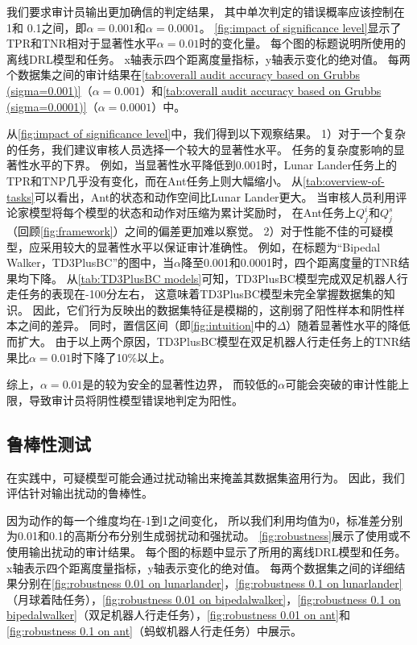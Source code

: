 我们要求审计员输出更加确信的判定结果，
其中单次判定的错误概率应该控制在 1\textperthousand 和 0.1\textperthousand 之间，即$\alpha=0.001$和$\alpha=0.0001$。
\autoref{fig:impact of significance level}显示了TPR和TNR相对于显著性水平$\alpha=0.01$时的变化量。
每个图的标题说明所使用的离线DRL模型和任务。
x轴表示四个距离度量指标，y轴表示变化的绝对值。
每两个数据集之间的审计结果在\autoref{tab:overall audit accuracy based on Grubbs (sigma=0.001)}（$\alpha=0.001$）和\autoref{tab:overall audit accuracy based on Grubbs (sigma=0.0001)}（$\alpha=0.0001$）中。

从\autoref{fig:impact of significance level}中，我们得到以下观察结果。
1）对于一个复杂的任务，我们建议审核人员选择一个较大的显著性水平。
任务的复杂度影响\sysnameo 的显著性水平的下界。
例如，当显著性水平降低到0.001时，Lunar Lander任务上的TPR和TNP几乎没有变化，而在Ant任务上则大幅缩小。
从\autoref{tab:overview-of-tasks}可以看出，Ant的状态和动作空间比Lunar Lander更大。
当审核人员利用评论家模型将每个模型的状态和动作对压缩为累计奖励时，
在Ant任务上$Q_j^i$和$Q_j^s$（回顾\autoref{fig:framework}）之间的偏差更加难以察觉。
2）对于性能不佳的可疑模型，\sysnameo 应采用较大的显著性水平以保证审计准确性。
例如，在标题为“Bipedal Walker，TD3PlusBC”的图中，当$\alpha$降至0.001和0.0001时，四个距离度量的TNR结果均下降。
从\autoref{tab:TD3PlusBC models}可知，TD3PlusBC模型完成双足机器人行走任务的表现在-100分左右，
这意味着TD3PlusBC模型未完全掌握数据集的知识。
因此，它们行为反映出的数据集特征是模糊的，这削弱了阳性样本和阴性样本之间的差异。
同时，置信区间（即\autoref{fig:intuition}中的$\Delta$）随着显著性水平的降低而扩大。
由于以上两个原因，TD3PlusBC模型在双足机器人行走任务上的TNR结果比$\alpha=0.01$时下降了10\%以上。

综上，$\alpha=0.01$是\sysnameo 的较为安全的显著性边界，
而较低的$\alpha$可能会突破\sysnameo 的审计性能上限，导致审计员将阴性模型错误地判定为阳性。

\subsection{鲁棒性测试}
\label{sec:robustness}
在实践中，可疑模型可能会通过扰动输出来掩盖其数据集盗用行为。
因此，我们评估\sysnameo 针对输出扰动的鲁棒性。

因为动作的每一个维度均在-1到1之间变化，
所以我们利用均值为0，标准差分别为0.01和0.1的高斯分布分别生成弱扰动和强扰动。 
\autoref{fig:robustness}展示了使用或不使用输出扰动的审计结果。
每个图的标题中显示了所用的离线DRL模型和任务。
x轴表示四个距离度量指标，y轴表示变化的绝对值。
每两个数据集之间的详细结果分别在\autoref{fig:robustness 0.01 on lunarlander}，\autoref{fig:robustness 0.1 on lunarlander}（月球着陆任务），\autoref{fig:robustness 0.01 on bipedalwalker}，\autoref{fig:robustness 0.1 on bipedalwalker}（双足机器人行走任务），\autoref{fig:robustness 0.01 on ant}和\autoref{fig:robustness 0.1 on ant}（蚂蚁机器人行走任务）中展示。

